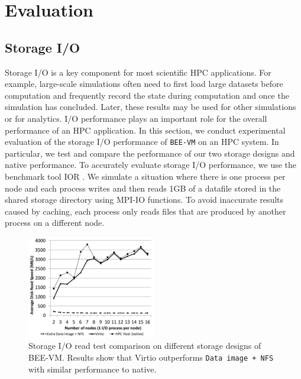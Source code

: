 \section{Evaluation}
\subsection{Storage I/O }
Storage I/O is a key component for most scientific HPC applications. For example, large-scale simulations often need to first load large datasets before computation and frequently record the state during computation and once the simulation has concluded. Later, these results may be used for other simulations or for analytics. I/O performance plays an important role for the overall performance of an HPC application. In this section, we conduct experimental evaluation of the storage I/O performance of \texttt{BEE-VM} on an HPC system. In particular, we test and compare the performance of our two storage designs and native performance. To accurately evaluate storage I/O performance, we use the benchmark tool IOR \cite{IOR}. We simulate a situation where there is one process per node and each process writes and then reads 1GB of a datafile stored in the shared storage directory using MPI-IO functions. To avoid inaccurate results caused by caching, each process only reads files that are produced by another process on a different node. 

\begin{figure}[h]
    \centering
    \includegraphics[width=0.5\textwidth]{figures/io-read-seq-test.pdf}
    \caption{Storage I/O read test comparison on different storage designs of BEE-VM. Results show that Virtio outperforms \texttt{Data image + NFS} with similar performance to native.}
    \label{io-test-read}
\end{figure}

